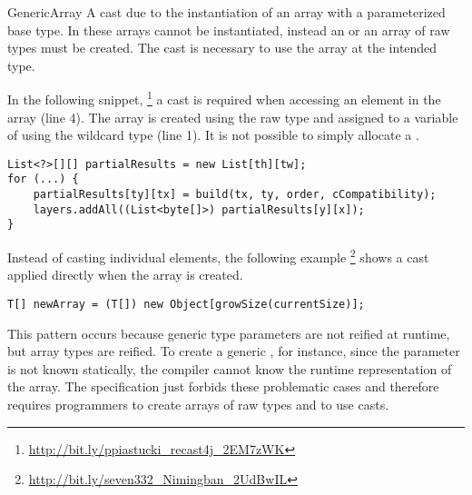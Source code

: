 \begin{pattern}{GenericArray}
A cast due to the instantiation of an array with a parameterized base type.
  In \java{} these arrays cannot be instantiated, instead an 
  or an array of raw types must be created.
  The cast is necessary to use the array at the intended type. 

\instances{}
In the following snippet,%
\footnote{\url{http://bit.ly/ppiastucki_recast4j_2EM7zWK}}
a cast is required when accessing an element in the array (line 4).
  The array is created using the raw type 
  and assigned to a variable of using the wildcard type 
  (line 1).
  It is not possible to simply allocate a .

\begin{verbatim}
List<?>[][] partialResults = new List[th][tw];
for (...) {
    partialResults[ty][tx] = build(tx, ty, order, cCompatibility);
    layers.addAll((List<byte[]>) partialResults[y][x]);
}
\end{verbatim}

Instead of casting individual elements,
the following example%
\footnote{\url{http://bit.ly/seven332_Nimingban_2UdBwIL}}
shows a cast applied directly when the array is created. 

\begin{verbatim}
T[] newArray = (T[]) new Object[growSize(currentSize)];
\end{verbatim}


\discussion{}
This pattern occurs because generic type parameters are not reified at runtime,
but array types are reified. To create a generic , for instance, since the
  parameter  is not known statically, the compiler cannot know the
  runtime representation of the array. The \java{} specification just forbids
  these problematic cases and therefore requires programmers to create
  arrays of raw types and to use casts.

\end{pattern}
